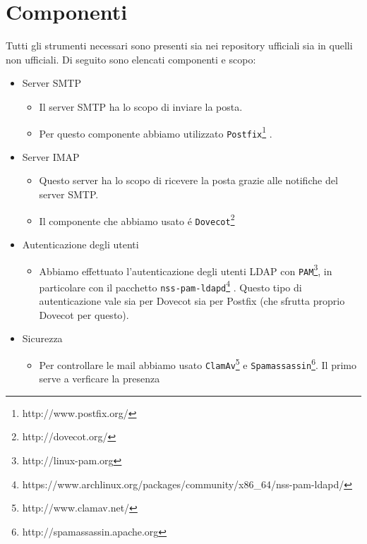 \documentclass[9pt, a4paper, oneside]{article}
\begin{document}
		\section{Componenti}
			\par
				Tutti gli strumenti necessari sono presenti 
				sia nei repository ufficiali sia in quelli non 
				ufficiali.
				Di seguito sono elencati componenti e scopo:
				\begin{itemize}
					\item
						Server SMTP
					\begin{itemize}
						\item
							Il server SMTP ha lo 
							scopo di inviare la 
							posta.
						\item
							Per questo componente 
							abbiamo utilizzato 
							\texttt{Postfix}\footnote{http://www.postfix.org/}
							. 
					\end{itemize}
					\item
						Server IMAP
					\begin{itemize}
						\item
							Questo server ha lo 
							scopo di ricevere la 
							posta grazie alle 
							notifiche del server 
							SMTP.
						\item
							Il componente che 
							abbiamo usato \'e
							\texttt{Dovecot}\footnote{http://dovecot.org/}
					\end{itemize}
					\item
						Autenticazione degli utenti
					\begin{itemize}
						\item
							Abbiamo effettuato 
							l'autenticazione 
							degli utenti LDAP con 
							\texttt{PAM}\footnote{http://linux-pam.org}, 
							in 
							particolare con il 
							pacchetto 
							\texttt{nss-pam-ldapd}\footnote{https://www.archlinux.org/packages/community/x86\_64/nss-pam-ldapd/}
							. 
							Questo tipo di 
							autenticazione vale sia 
							per Dovecot sia per 
							Postfix (che sfrutta 
							proprio Dovecot per 
							questo).
					\end{itemize}
					\item
						Sicurezza
					\begin{itemize}
						\item
							Per controllare le mail 
							abbiamo usato 
							\texttt{ClamAv}\footnote{http://www.clamav.net/} 
							e 
							\texttt{Spamassassin}\footnote{http://spamassassin.apache.org}.
							Il primo serve a 
							verficare la presenza 

\end{itemize}
\end{itemize}
\end{document}
